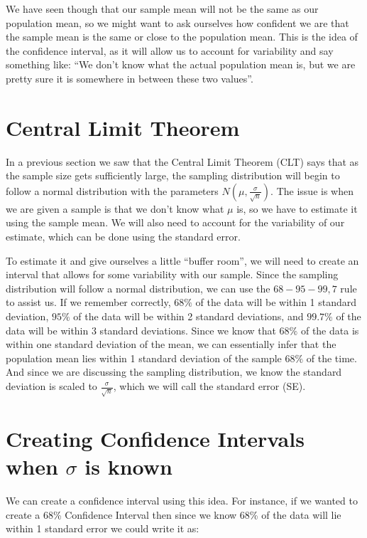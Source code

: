 \documentclass[
  letterpaper,
  DIV=11,
  numbers=noendperiod]{scrreprt}
\begin{document}
We have seen though that our sample mean will not be the same as our
population mean, so we might want to ask ourselves how confident we are
that the sample mean is the same or close to the population mean. This
is the idea of the confidence interval, as it will allow us to account
for variability and say something like: ``We don't know what the actual
population mean is, but we are pretty sure it is somewhere in between
these two values''.

\section{Central Limit Theorem}\label{central-limit-theorem-2}

In a previous section we saw that the Central Limit Theorem (CLT) says
that as the sample size gets sufficiently large, the sampling
distribution will begin to follow a normal distribution with the
parameters \(N(\mu, \frac{\sigma}{\sqrt{n}})\). The issue is when we are
given a sample is that we don't know what \(\mu\) is, so we have to
estimate it using the sample mean. We will also need to account for the
variability of our estimate, which can be done using the standard error.

To estimate it and give ourselves a little ``buffer room'', we will need
to create an interval that allows for some variability with our sample.
Since the sampling distribution will follow a normal distribution, we
can use the \(68-95-99,7\) rule to assist us. If we remember correctly,
\(68\%\) of the data will be within 1 standard deviation, \(95\%\) of
the data will be within 2 standard deviations, and \(99.7\%\) of the
data will be within 3 standard deviations. Since we know that \(68\%\)
of the data is within one standard deviation of the mean, we can
essentially infer that the population mean lies within 1 standard
deviation of the sample \(68\%\) of the time. And since we are
discussing the sampling distribution, we know the standard deviation is
scaled to \(\frac{\sigma}{\sqrt{n}}\), which we will call the standard
error (SE).

\section{\texorpdfstring{Creating Confidence Intervals when \(\sigma\)
is
known}{Creating Confidence Intervals when \textbackslash sigma is known}}\label{creating-confidence-intervals-when-sigma-is-known}

We can create a confidence interval using this idea. For instance, if we
wanted to create a 68\% Confidence Interval then since we know 68\% of
the data will lie within 1 standard error we could write it as:
\end{document}

